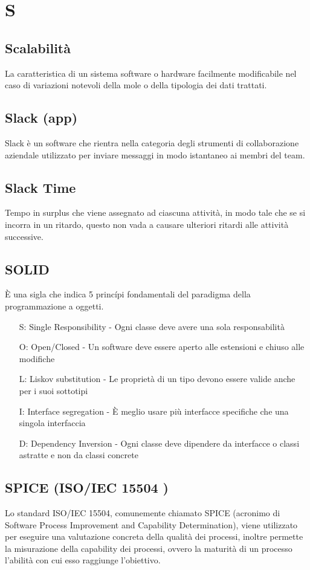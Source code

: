 {	\section{S}
	\subsection{Scalabilità}
	La caratteristica di un sistema software o hardware facilmente modificabile nel caso di variazioni notevoli della mole o della tipologia dei dati trattati.
	
	\subsection{Slack (app)} 
	Slack è un software che rientra nella categoria degli strumenti di collaborazione aziendale utilizzato per inviare messaggi in modo istantaneo ai membri del team.
	
	\subsection{Slack Time}
	Tempo in surplus che viene assegnato ad ciascuna attività, in modo tale che se si incorra in un ritardo, questo non vada a causare ulteriori ritardi alle attività successive.
	
	\subsection{SOLID}
	\`E una sigla che indica 5 princ\'{i}pi fondamentali del paradigma della programmazione a oggetti.
	\begin{itemize}
		\item[S:] Single Responsibility - Ogni classe deve avere una sola responsabilità
		\item[O:] Open/Closed - Un software deve essere aperto alle estensioni e chiuso alle modifiche
		\item[L:] Liskov substitution - Le proprietà di un tipo devono essere valide anche per i suoi sottotipi
		\item[I:] Interface segregation - \`E meglio usare più interfacce specifiche che una singola interfaccia
		\item[D:] Dependency Inversion - Ogni classe deve dipendere da interfacce o classi astratte e non da classi concrete
	\end{itemize}
	 
	\subsection{SPICE (ISO/IEC 15504 )}
	Lo standard ISO/IEC 15504, comunemente chiamato SPICE (acronimo di Software Process Improvement and Capability Determination), viene utilizzato per eseguire una valutazione concreta della qualità dei processi, inoltre permette la misurazione della capability dei processi, ovvero la maturità
	di un processo l’abilità con cui esso raggiunge l’obiettivo.
	
}
